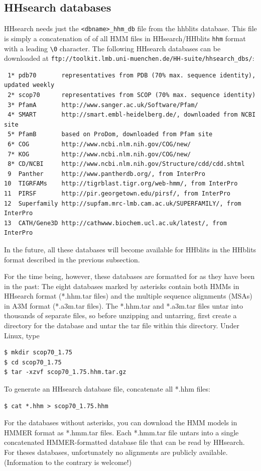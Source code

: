 \documentclass[11pt,a4paper]{article}
\begin{document}
\subsection{HHsearch databases} \label{hhsearch_dbs}
HHsearch needs just the \verb`<dbname>_hhm_db` file from the hhblits database. This file is simply a concatenation of of all HMM files in HHsearch/HHblits \verb`hhm` format with a leading \verb`\0` character. The following HHsearch databases can be downloaded at
\verb`ftp://toolkit.lmb.uni-muenchen.de/HH-suite/hhsearch_dbs/`: 

\small 
\begin{verbatim}
 1* pdb70       representatives from PDB (70% max. sequence identity), updated weekly
 2* scop70      representatives from SCOP (70% max. sequence identity)
 3* PfamA       http://www.sanger.ac.uk/Software/Pfam/
 4* SMART       http://smart.embl-heidelberg.de/, downloaded from NCBI site
 5* PfamB       based on ProDom, downloaded from Pfam site
 6* COG         http://www.ncbi.nlm.nih.gov/COG/new/
 7* KOG	        http://www.ncbi.nlm.nih.gov/COG/new/
 8* CD/NCBI     http://www.ncbi.nlm.nih.gov/Structure/cdd/cdd.shtml
 9  Panther     http://www.pantherdb.org/, from InterPro
10  TIGRFAMs    http://tigrblast.tigr.org/web-hmm/, from InterPro
11  PIRSF       http://pir.georgetown.edu/pirsf/, from InterPro
12  Superfamily http://supfam.mrc-lmb.cam.ac.uk/SUPERFAMILY/, from InterPro
13  CATH/Gene3D http://cathwww.biochem.ucl.ac.uk/latest/, from InterPro 
\end{verbatim} 
\normalsize
In the future, all these databases will become available for HHblits in the HHblits format described in the previous subsection.

For the time being, however, these databases are formatted for as they have been in the past:
The eight databases marked by asterisks contain both HMMs in HHsearch 
format (*.hhm.tar files) and the multiple sequence alignments (MSAs) in 
A3M format (*.a3m.tar files).  The *.hhm.tar and *.a3m.tar files untar into thousands
of separate files, so before unzipping and untarring, first create a directory for 
the database and untar the tar file within this directory. Under Linux, type
\begin{verbatim}
$ mkdir scop70_1.75
$ cd scop70_1.75
$ tar -xzvf scop70_1.75.hhm.tar.gz
\end{verbatim}

To generate an HHsearch database file, concatenate all *.hhm files:
\begin{verbatim}
$ cat *.hhm > scop70_1.75.hhm
\end{verbatim}
For the databases without asterisks, you can download the HMM models in HMMER format as 
*.hmm.tar files. Each *.hmm.tar file untars into a single concatenated HMMER-formatted 
database file that can be read by HHsearch. For theses databases, unfortunately no 
alignments are publicly available. (Information to the contrary is welcome!) 
\end{document}
